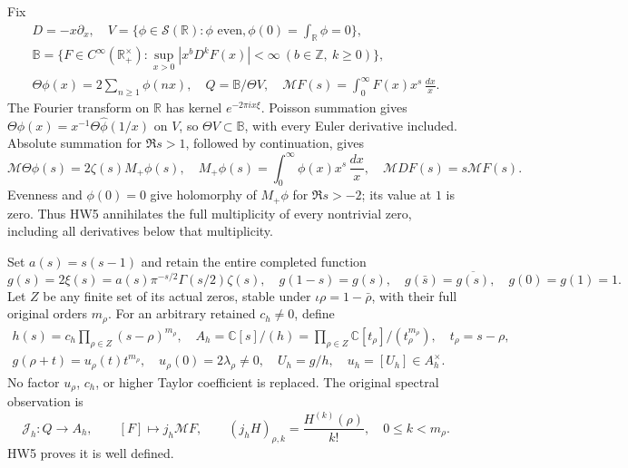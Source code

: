 \documentclass[11pt,a4paper]{article}
\theoremstyle{definition}\newtheorem{definition}[theorem]{Definition}
\newcommand{\Z}{\mathbb Z}\newcommand{\Q}{\mathbb Q}
\newcommand{\C}{\mathbb C}\newcommand{\R}{\mathbb R}
\newcommand{\B}{\mathbb B}\newcommand{\N}{\mathbb N}
\providecommand{\M}{\mathcal M}
\begin{document}
Fix
\[
 \begin{gathered}
 D=-x\partial_x,\quad
 V=\{\phi\in\mathcal S(\R):\phi\text{ even},
                   \phi(0)=\int_\R\phi=0\},\\
 \B=\{F\in C^\infty(\R_+^\times):
       \sup_{x>0}|x^bD^kF(x)|<\infty
                    \ (b\in\Z,\ k\ge0)\},\\
 \Theta\phi(x)=2\sum_{n\ge1}\phi(nx),\quad Q=\B/\Theta V,\quad
 \M F(s)=\int_0^\infty F(x)x^s\,\frac{dx}{x}.
 \end{gathered}
 \tag{HW4}\label{hw:spaces}
\]
The Fourier transform on \(\R\) has kernel \(e^{-2\pi ix\xi}\).
Poisson summation gives
\(\Theta\phi(x)=x^{-1}\Theta\widehat\phi(1/x)\) on \(V\),
so \(\Theta V\subset\B\), with every Euler derivative included.
Absolute summation for \(\Re s>1\), followed by continuation, gives
\[
 \M\Theta\phi(s)=2\zeta(s)M_+\phi(s),\quad
 M_+\phi(s)=\int_0^\infty\phi(x)x^s\,\frac{dx}{x},\quad
 \M DF(s)=s\M F(s).
 \tag{HW5}\label{hw:theta}
\]
Evenness and \(\phi(0)=0\) give holomorphy of \(M_+\phi\)
for \(\Re s>-2\); its value at \(1\) is zero. Thus HW5
annihilates the full multiplicity of every nontrivial zero,
including all derivatives below that multiplicity.

Set \(a(s)=s(s-1)\) and retain the entire completed function
\[
 g(s)=2\xi(s)=a(s)\pi^{-s/2}\Gamma(s/2)\zeta(s),\quad
 g(1-s)=g(s),\quad g(\bar s)=\overline{g(s)},\quad g(0)=g(1)=1.
 \tag{HW6}
\]
Let \(Z\) be any finite set of its actual zeros, stable under
\(\iota\rho=1-\bar\rho\), with their full original orders \(m_\rho\).
For an arbitrary retained \(c_h\ne0\), define
\[
 \begin{gathered}
 h(s)=c_h\prod_{\rho\in Z}(s-\rho)^{m_\rho},\quad
 A_h=\C[s]/(h)=\prod_{\rho\in Z}\C[t_\rho]/(t_\rho^{m_\rho}),
       \quad t_\rho=s-\rho,\\
 g(\rho+t)=u_\rho(t)t^{m_\rho},\quad
 u_\rho(0)=2\lambda_\rho\ne0,\quad
 U_h=g/h,\quad u_h=[U_h]\in A_h^\times.
 \end{gathered}
 \tag{HW7}\label{hw:packet}
\]
No factor \(u_\rho\), \(c_h\), or higher Taylor coefficient is
replaced. The original spectral observation is
\[
 \mathcal J_h:Q\longrightarrow A_h,\qquad
 [F]\longmapsto j_h\M F,\qquad
 (j_h H)_{\rho,k}=\frac{H^{(k)}(\rho)}{k!},\quad 0\le k<m_\rho .
 \tag{HW8}\label{hw:jetmap}
\]
HW5 proves it is well defined.
\end{document}
